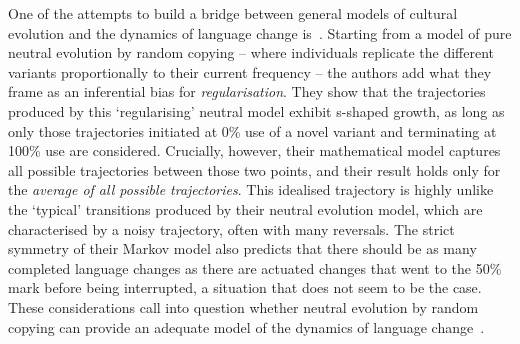 \documentclass[10pt]{article}
\begin{document}
One of the attempts to build a bridge between general models of cultural evolution and the dynamics of language change is~\citet{Reali2010}. Starting from a model of pure neutral evolution by random copying -- where individuals replicate the different variants proportionally to their current frequency -- the authors add what they frame as an inferential bias for \emph{regularisation}. 
They show that the trajectories produced by this `regularising' neutral model exhibit s-shaped growth, as long as only those trajectories initiated at 0\% use of a novel variant and terminating at 100\% use are considered. Crucially, however, their mathematical model captures all possible trajectories between those two points, and their result holds only for the \emph{average of all possible trajectories}. This idealised trajectory is highly unlike the `typical' transitions produced by their neutral evolution model, which are characterised by a noisy trajectory, often with many reversals. The strict symmetry of their Markov model also predicts that there should be as many completed language changes as there are actuated changes that went to the 50\% mark before being interrupted, a situation that does not seem to be the case. These considerations call into question whether neutral evolution by random copying can provide an adequate model of the dynamics of language change~\citep{Blythe2012neutral}.
\end{document}
